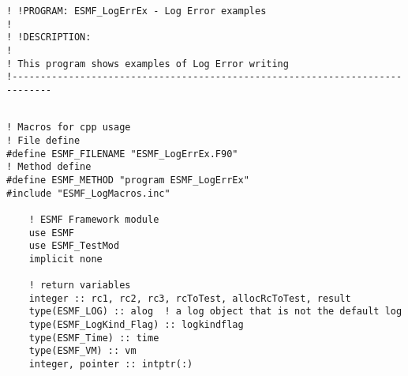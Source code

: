  
\setlength{\oldparskip}{\parskip}
\setlength{\parskip}{1.5ex}
\setlength{\oldparindent}{\parindent}
\setlength{\parindent}{0pt}
\setlength{\oldbaselineskip}{\baselineskip}
\setlength{\baselineskip}{11pt}
 
\def\bv{\begin{verbatim}}
\def\ev{\end{verbatim}}
\def\be{\begin{equation}}
\def\ee{\end{equation}}
\def\bea{\begin{eqnarray}}
\def\eea{\end{eqnarray}}
\def\bi{\begin{itemize}}
\def\ei{\end{itemize}}
\def\bn{\begin{enumerate}}
\def\en{\end{enumerate}}
\def\bd{\begin{description}}
\def\ed{\end{description}}
\def\({\left (}
\def\){\right )}
\def\[{\left [}
\def\]{\right ]}
\def\<{\left  \langle}
\def\>{\right \rangle}
\def\cI{{\cal I}}
\def\diag{\mathop{\rm diag}}
\def\tr{\mathop{\rm tr}}


 

 \begin{verbatim}
! !PROGRAM: ESMF_LogErrEx - Log Error examples
!
! !DESCRIPTION:
!
! This program shows examples of Log Error writing
!-----------------------------------------------------------------------------
 
\end{verbatim}
 

 \begin{verbatim}
! Macros for cpp usage
! File define
#define ESMF_FILENAME "ESMF_LogErrEx.F90"
! Method define
#define ESMF_METHOD "program ESMF_LogErrEx"
#include "ESMF_LogMacros.inc"

    ! ESMF Framework module
    use ESMF
    use ESMF_TestMod
    implicit none

    ! return variables
    integer :: rc1, rc2, rc3, rcToTest, allocRcToTest, result
    type(ESMF_LOG) :: alog  ! a log object that is not the default log
    type(ESMF_LogKind_Flag) :: logkindflag
    type(ESMF_Time) :: time
    type(ESMF_VM) :: vm
    integer, pointer :: intptr(:)
 
\end{verbatim}
 
